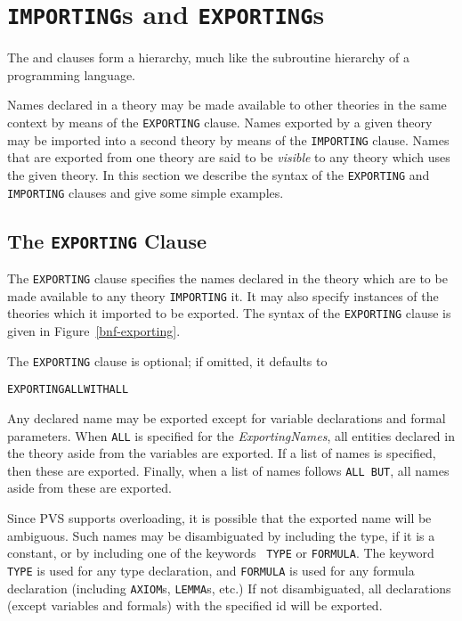 

\section{{\tt IMPORTING}s and {\tt EXPORTING}s}\label{importings}

The  and  clauses form a hierarchy,
much like the subroutine hierarchy of a programming
language.

Names declared in a theory may be made available to other theories in
the same context by means of the {\tt EXPORTING} clause.  Names exported
by a given theory may be imported into a second theory by means of the
{\tt IMPORTING} clause.  Names that are exported from one theory are said to
be {\em visible\/} to any theory which uses the given theory.  In this
section we describe the syntax of the {\tt EXPORTING} and {\tt IMPORTING}
clauses and give some simple examples.



\subsection{The {\tt EXPORTING} Clause}

The {\tt EXPORTING} clause specifies the names declared in the theory
which are to be made available to any theory \texttt{IMPORTING} it.  It may
also specify instances of the theories which it imported to be exported.
The syntax of the {\tt EXPORTING} clause is given in
Figure~\ref{bnf-exporting}.

\noindent
The {\tt EXPORTING} clause is optional; if omitted, it defaults to
\begin{alltt}
  EXPORTING ALL WITH ALL
\end{alltt}

Any declared name may be exported except for variable declarations and formal parameters.
When {\tt ALL} is specified for the {\em ExportingNames\/}, all
entities declared in the theory aside from the variables are exported.
If a list of names is specified, then these are exported.  Finally, when
a list of names follows {\tt ALL BUT}, all names aside from these are exported.

Since PVS supports overloading, it is possible that the exported name
will be ambiguous.  Such names may be disambiguated by including the
type, if it is a constant, or by including one of the keywords {\tt
TYPE} or {\tt FORMULA}.  The keyword {\tt TYPE} is used for any type
declaration, and {\tt FORMULA} is used for any formula declaration
(including {\tt AXIOM}s, {\tt LEMMA}s, etc.)  If not disambiguated, all
declarations (except variables and formals) with the specified id will be exported.

